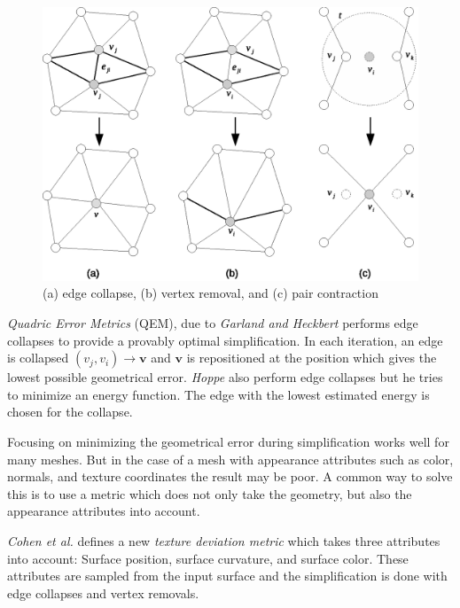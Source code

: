 \begin{figure}[h]
    \centering
    \includegraphics[width=\textwidth]{figures/mesh_transformations.eps}
    \caption{(a) edge collapse, (b) vertex removal, and (c) pair contraction}
    \label{fig:mesh_transformations}
\end{figure}

\emph{Quadric Error Metrics} (QEM), due to \emph{Garland and Heckbert} \cite{garland1997surface} performs edge collapses to provide a provably optimal simplification. In each iteration, an edge is collapsed \((v_j, v_i) \rightarrow \mathbf{v}\) and \(\mathbf{v}\) is repositioned at the position which gives the lowest possible geometrical error. \emph{Hoppe} \cite{hoppe1996progressive} also perform edge collapses but he tries to minimize an energy function. The edge with the lowest estimated energy is chosen for the collapse. 


Focusing on minimizing the geometrical error during simplification works well for many meshes. But in the case of a mesh with appearance attributes such as color, normals, and texture coordinates the result may be poor. A common way to solve this is to use a metric which does not only take the geometry, but also the appearance attributes into account.

\emph{Cohen et al.} \cite{cohen1998appearance} defines a new \emph{texture deviation metric} which takes three attributes into account: Surface position, surface curvature, and surface color. These attributes are sampled from the input surface and the simplification is done with edge collapses and vertex removals.

